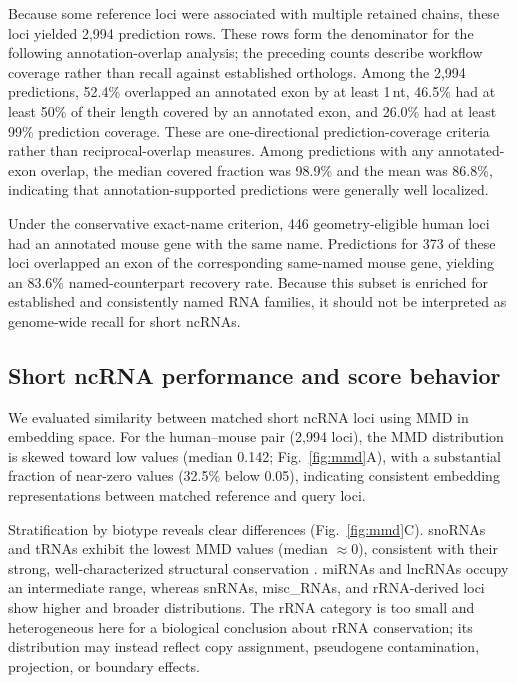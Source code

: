 Because some reference loci were associated with multiple retained chains, these
loci yielded 2{,}994 prediction rows. These rows form the denominator for the
following annotation-overlap analysis; the preceding counts describe workflow
coverage rather than recall against established orthologs. Among the 2{,}994
predictions, 52.4\% overlapped an annotated exon by at least 1\,nt, 46.5\% had at
least 50\% of their length covered by an annotated exon, and 26.0\% had at least
99\% prediction coverage. These are one-directional prediction-coverage
criteria rather than reciprocal-overlap measures. Among predictions with any
annotated-exon overlap, the median covered fraction was 98.9\% and the mean was
86.8\%, indicating that annotation-supported predictions were generally well
localized.

Under the conservative exact-name criterion, 446 geometry-eligible human loci
had an annotated mouse gene with the same name. Predictions for 373 of these loci
overlapped an exon of the corresponding same-named mouse gene, yielding an
83.6\% named-counterpart recovery rate. Because this subset is enriched for
established and consistently named RNA families, it should not be interpreted as
genome-wide recall for short ncRNAs.

\subsection{Short ncRNA performance and score behavior}
We evaluated similarity between matched short ncRNA loci using MMD in embedding
space. For the human--mouse pair (2{,}994 loci), the MMD distribution is skewed
toward low values (median 0.142; Fig.~\ref{fig:mmd}A), with a substantial fraction
of near-zero values (32.5\% below 0.05), indicating consistent embedding
representations between matched reference and query loci.

Stratification by biotype reveals clear differences (Fig.~\ref{fig:mmd}C).
snoRNAs and tRNAs exhibit the lowest MMD values (median $\approx 0$), consistent
with their strong, well-characterized structural conservation
\citep{chanTRNAscanSE20Improved2021}. miRNAs and lncRNAs occupy an intermediate
range, whereas snRNAs, misc\_RNAs, and rRNA-derived loci show higher and broader
distributions. The rRNA category is too small and heterogeneous here for a
biological conclusion about rRNA conservation; its distribution may instead
reflect copy assignment, pseudogene contamination, projection, or boundary
effects.


